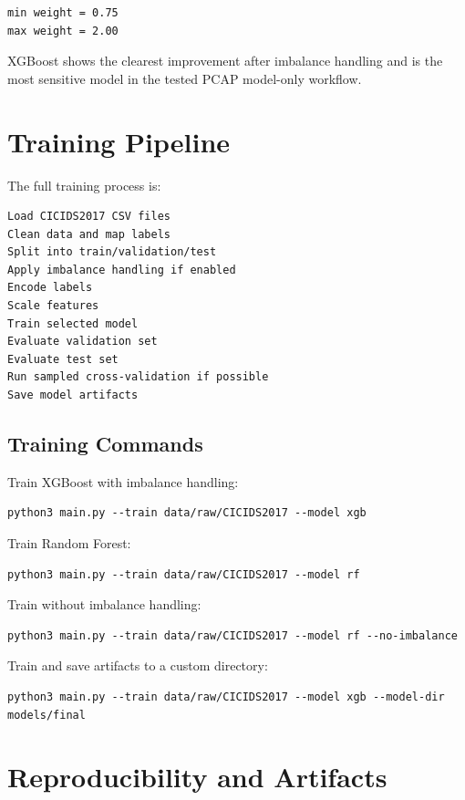 \documentclass[12pt,a4paper]{article}
\begin{document}
\begin{lstlisting}
min weight = 0.75
max weight = 2.00
\end{lstlisting}

XGBoost shows the clearest improvement after imbalance handling and is the most sensitive model in the tested PCAP model-only workflow.

\section{Training Pipeline}

The full training process is:

\begin{lstlisting}
Load CICIDS2017 CSV files
Clean data and map labels
Split into train/validation/test
Apply imbalance handling if enabled
Encode labels
Scale features
Train selected model
Evaluate validation set
Evaluate test set
Run sampled cross-validation if possible
Save model artifacts
\end{lstlisting}

\subsection{Training Commands}

Train XGBoost with imbalance handling:

\begin{lstlisting}
python3 main.py --train data/raw/CICIDS2017 --model xgb
\end{lstlisting}

Train Random Forest:

\begin{lstlisting}
python3 main.py --train data/raw/CICIDS2017 --model rf
\end{lstlisting}

Train without imbalance handling:

\begin{lstlisting}
python3 main.py --train data/raw/CICIDS2017 --model rf --no-imbalance
\end{lstlisting}

Train and save artifacts to a custom directory:

\begin{lstlisting}
python3 main.py --train data/raw/CICIDS2017 --model xgb --model-dir models/final
\end{lstlisting}

\section{Reproducibility and Artifacts}
\end{document}
